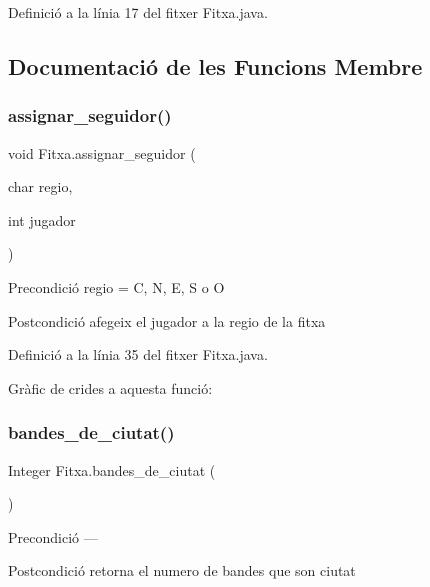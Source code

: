 Definició a la línia 17 del fitxer Fitxa.\+java.



\subsection{Documentació de les Funcions Membre}
\mbox{\label{class_fitxa_aada7b61d86ed4703252c9a9d3ea9ce1d}} 
\subsubsection{\texorpdfstring{assignar\+\_\+seguidor()}{assignar\_seguidor()}}
{\footnotesize\ttfamily void Fitxa.\+assignar\+\_\+seguidor (\begin{DoxyParamCaption}\item[{char}]{regio,  }\item[{int}]{jugador }\end{DoxyParamCaption})}

\begin{DoxyPrecond}{Precondició}
regio = C, N, E, S o O 
\end{DoxyPrecond}
\begin{DoxyPostcond}{Postcondició}
afegeix el jugador a la regio de la fitxa 
\end{DoxyPostcond}


Definició a la línia 35 del fitxer Fitxa.\+java.

Gràfic de crides a aquesta funció\+:
\mbox{\label{class_fitxa_a8fd756e25d359b4e2b2f4c09138f2219}} 
\subsubsection{\texorpdfstring{bandes\+\_\+de\+\_\+ciutat()}{bandes\_de\_ciutat()}}
{\footnotesize\ttfamily Integer Fitxa.\+bandes\+\_\+de\+\_\+ciutat (\begin{DoxyParamCaption}{ }\end{DoxyParamCaption})}

\begin{DoxyPrecond}{Precondició}
--- 
\end{DoxyPrecond}
\begin{DoxyPostcond}{Postcondició}
retorna el numero de bandes que son ciutat 
\end{DoxyPostcond}


